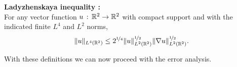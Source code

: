 \begin{definition} \label{def:Ladyzhenskaya}
  \textbf{Ladyzhenskaya inequality \cite{Layton08}:}\\
  For any vector function $u\,:\, \mathbb{R}^2 \rightarrow \mathbb{R}^2$ with compact support
  and with the indicated finite $L^4$ and $L^2$ norms,
  \begin{equation}
    \|u\|_{L^4(\mathbb{R}^2)} \le 2^{\nicefrac{1}{4}}
      \|u\|^{\nicefrac{1}{2}}_{L^2(\mathbb{R}^2)}
      \|\nabla u\|^{\nicefrac{1}{2}}_{L^2(\mathbb{R}^2)}.
    \label{eqn:Ladyzhenskaya}
  \end{equation}
\end{definition}
With these definitions we can now proceed with the error analysis.
